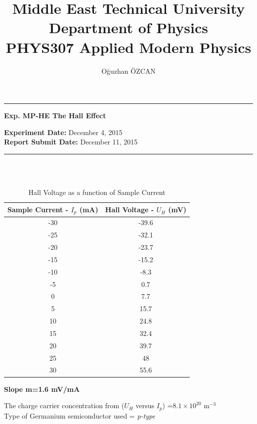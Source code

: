\documentclass[a4paper,12pt]{article}
\title{Middle East Technical University\\Department of Physics\\\textbf{PHYS307 Applied Modern Physics}}
\author{Oğuzhan ÖZCAN\\}
\date{}
\providecommand{\expdate}[1]{\textbf{Experiment Date:} }
\providecommand{\repdate}[1]{\textbf{Report Submit Date:} }
\providecommand{\expname}[1]{\textbf{Exp. MP-HE The Hall Effect} }
\begin{document}
\maketitle

\thispagestyle{fancy}

\noindent\rule{18.4cm}{0.8pt}
\begin{center}
	\expname{arg1}{}
\end{center}

\expdate{November 6, 2015}{December 4, 2015}\\
\repdate{arg1}{December 11, 2015}\\
\noindent\rule{18.4cm}{0.8pt}\\\\
\begin{table}[h!]
\begin{center}
	\begin{tabular}{|c|c|}
	\hline Sample Current - $I_{p}$ (mA) & Hall Voltage - $U_{H}$ (mV) \\ 
	\hline -30 & -39.6 \\ 
	\hline -25 & -32.1 \\ 
	\hline -20 & -23.7 \\ 
	\hline -15 & -15.2 \\ 
	\hline -10 & -8.3 \\ 
	\hline -5 & 0.7 \\ 
	\hline 0 & 7.7 \\ 
	\hline 5 & 15.7 \\ 
	\hline 10 & 24.8 \\ 
	\hline 15 & 32.4 \\ 
	\hline 20 & 39.7 \\ 
	\hline 25 & 48 \\ 
	\hline 30 & 55.6 \\ 
	\hline 
\end{tabular}
\caption{Hall Voltage as a function of Sample Current}
\end{center} 
\end{table}
\begin{center}
\textbf{Slope m=1.6 mV/mA}
\end{center}
\textbullet 	The charge carrier concentration from ($U_{H}$ versus $I_{p}$) =$8.1 \times 10^{20}$ m$^{-3}$\\
\textbullet 	Type of Germanium semiconductor used = \textit{p-type}
\newpage
\end{document}
